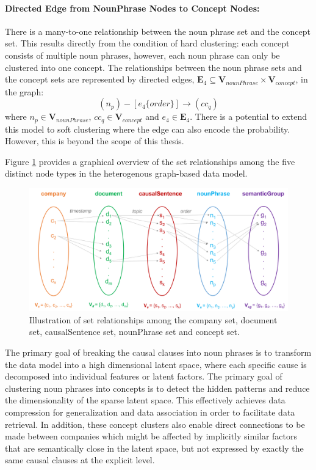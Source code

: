 \paragraph{Directed Edge from NounPhrase Nodes to Concept Nodes:} There is a many-to-one relationship between the noun phrase set and the concept set. This results directly from the condition of hard clustering: each concept consists of multiple noun phrases, however, each noun phrase can only be clustered into one concept. The relationships between the noun phrase sets and the concept sets are represented by directed edges, $\mathbf{E}_4 \subseteq \mathbf{V}_{nounPhrase} \times \mathbf{V}_{concept}$, in the graph:
\[( n_p ) - [ e_4 \{order\} ]\rightarrow ( cc_q ) \] 
where $n_p \in \mathbf{V}_{nounPhrase}$, $cc_q \in \mathbf{V}_{concept}$ and $e_4 \in \mathbf{E}_4$.
There is a potential to extend this model to soft clustering where the edge can also encode the probability. However, this is beyond the scope of this thesis. 


Figure \ref{fig:AssumpSet} provides a graphical overview of the set relationships among the five distinct node types in the heterogenous graph-based data model.
\begin{figure}[h!]
\centering
  \includegraphics[scale=0.4]{figures/Sets.png}
  \caption{Illustration of set relationships among the company set, document set, causalSentence set, nounPhrase set and concept set.}
  \label{fig:AssumpSet}
\end{figure}

The primary goal of breaking the causal clauses into noun phrases is to transform the data model into a high dimensional latent space, where each specific cause is decomposed into individual features or latent factors. The primary goal of clustering noun phrases into concepts is to detect the hidden patterns and reduce the dimensionality of the sparse latent space. This effectively achieves data compression for generalization and data association in order to facilitate data retrieval. In addition, these concept clusters also enable direct connections to be made between companies which might be affected by implicitly similar factors that are semantically close in the latent space, but not expressed by exactly the same causal clauses at the explicit level. 

